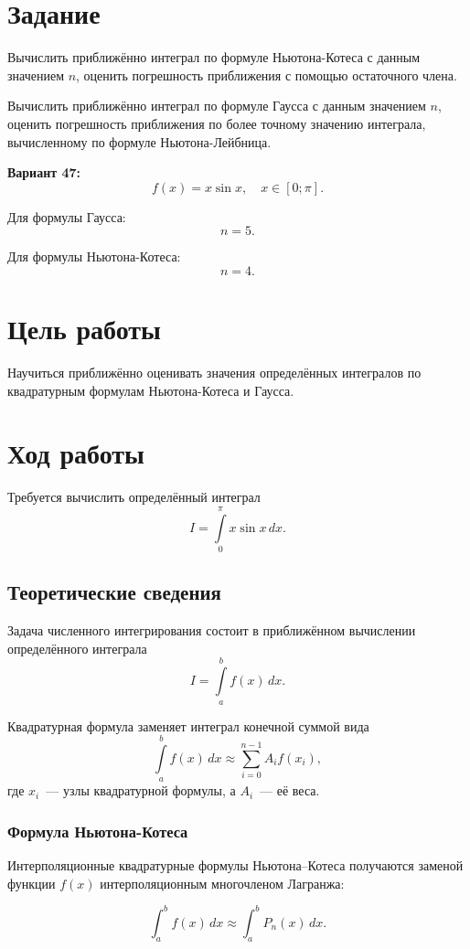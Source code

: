 \section{Задание}
Вычислить приближённо интеграл по формуле Ньютона-Котеса с данным значением $n$, оценить погрешность приближения с помощью остаточного члена.

Вычислить приближённо интеграл по формуле Гаусса с данным значением $n$, оценить погрешность приближения по более точному значению интеграла, вычисленному по формуле Ньютона-Лейбница.

\medskip
\noindent\textbf{Вариант 47:}
\[
    f(x)=x\sin x, \quad x\in[0;\pi].
\]

Для формулы Гаусса:
\[
    n=5.
\]

Для формулы Ньютона-Котеса:
\[
    n=4.
\]

\section{Цель работы}
Научиться приближённо оценивать значения определённых интегралов по квадратурным формулам Ньютона-Котеса и Гаусса.

\section{Ход работы}

Требуется вычислить определённый интеграл
\[
I=\int\limits_0^{\pi}x\sin x\,dx.
\]

\subsection{Теоретические сведения}

Задача численного интегрирования состоит в приближённом вычислении определённого интеграла
\[
I=\int\limits_a^b f(x)\,dx.
\]

Квадратурная формула заменяет интеграл конечной суммой вида
\[
\int\limits_a^b f(x)\,dx \approx \sum_{i=0}^{n-1} A_i f(x_i),
\]
где $x_i$~--- узлы квадратурной формулы, а $A_i$~--- её веса.

\subsubsection*{Формула Ньютона-Котеса}
Интерполяционные квадратурные формулы Ньютона–Котеса получаются заменой функции $f(x)$ интерполяционным многочленом Лагранжа:

\[
\int_a^b f(x)\,dx \approx \int_a^b P_n(x)\,dx.
\]


